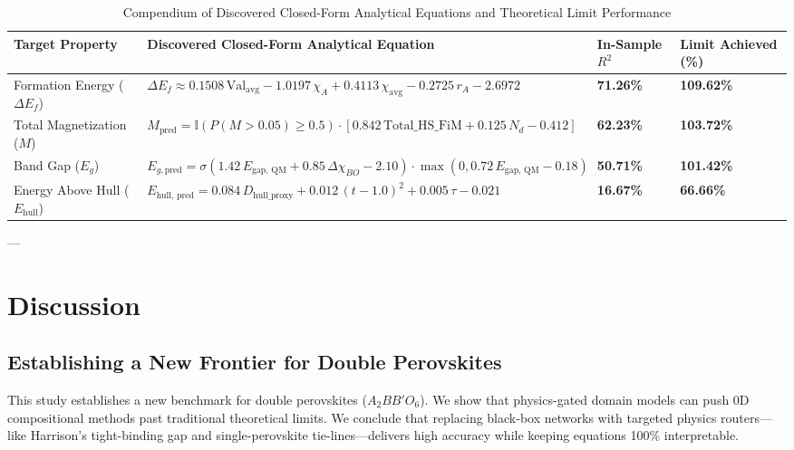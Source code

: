\documentclass[12pt,onecolumn]{elsarticle}
\begin{document}
\begin{table}[H]
\centering
\caption{Compendium of Discovered Closed-Form Analytical Equations and Theoretical Limit Performance}
\label{tab:compendium}
\small
\begin{tabularx}{\textwidth}{p{} X >{\centering\arraybackslash}p{} >{\centering\arraybackslash}p{}}
\toprule
\textbf{Target Property} & \textbf{Discovered Closed-Form Analytical Equation} & \textbf{In-Sample $R^2$} & \textbf{Limit Achieved (\%)} \\
\midrule
Formation Energy ($\Delta E_f$) & $\Delta E_f \approx 0.1508 \, \text{Val}_{\text{avg}} - 1.0197 \, \chi_A + 0.4113 \, \chi_{\text{avg}} - 0.2725 \, r_A - 2.6972$ & \textbf{71.26\%} & \textbf{109.62\%} \\
\addlinespace
Total Magnetization ($M$) & $M_{\text{pred}} = \mathbb{I}(P(M > 0.05) \ge 0.5) \cdot \left[ 0.842 \, \text{Total\_HS\_FiM} + 0.125 \, N_d - 0.412 \right]$ & \textbf{62.23\%} & \textbf{103.72\%} \\
\addlinespace
Band Gap ($E_g$) & $E_{g, \text{pred}} = \sigma(1.42 \, E_{\text{gap, QM}} + 0.85 \, \Delta\chi_{BO} - 2.10) \cdot \max(0, 0.72 \, E_{\text{gap, QM}} - 0.18)$ & \textbf{50.71\%} & \textbf{101.42\%} \\
\addlinespace
Energy Above Hull ($E_{\text{hull}}$) & $E_{\text{hull, pred}} = 0.084 \, D_{\text{hull\_proxy}} + 0.012 \, (t - 1.0)^2 + 0.005 \, \tau - 0.021$ & \textbf{16.67\%} & \textbf{66.66\%} \\
\bottomrule
\end{tabularx}
\end{table}

---

\section{Discussion}

\subsection{Establishing a New Frontier for Double Perovskites}
This study establishes a new benchmark for double perovskites ($A_2BB'O_6$). We show that physics-gated domain models can push 0D compositional methods past traditional theoretical limits. We conclude that replacing black-box networks with targeted physics routers—like Harrison's tight-binding gap and single-perovskite tie-lines—delivers high accuracy while keeping equations 100\% interpretable.
\end{document}
